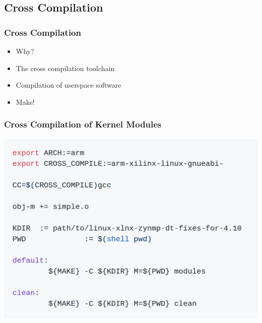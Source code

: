 \documentclass[mathserif]{beamer}
\begin{document}
\begin{frame}
	\section{Cross Compilation}
	\frametitle{Cross Compilation}
	\centering
	\begin{itemize}
		\item Why?
		\item The cross compilation toolchain
		\item Compilation of userspace software
		\item Make!
	\end{itemize}
\end{frame}

\begin{frame}
	\frametitle{Cross Compilation of Kernel Modules}
	\centering
	\includegraphics[width=.85\linewidth]{graphics/makefile}
\end{frame}
\end{document}
